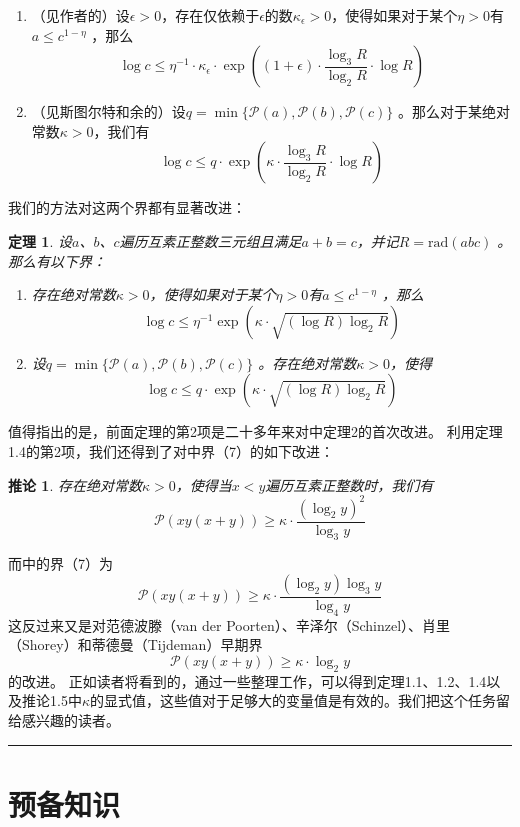\documentclass{article}
\newtheorem{theorem}{定理}
\newtheorem{corollary}{推论}
\begin{document}
\begin{enumerate}
\item （见作者的\cite{6}）设\(\epsilon>0\)，存在仅依赖于\(\epsilon\)的数\(\kappa_{\epsilon}>0\)，使得如果对于某个\(\eta>0\)有\(a \leq c^{1-\eta}\) ，那么
\[
\log c \leq \eta^{-1} \cdot \kappa_{\epsilon} \cdot \exp \left((1+\epsilon) \cdot \frac{\log _{3} R}{\log _{2} R} \cdot \log R\right) 
\]
\item
（见斯图尔特和余的\cite{12}）设\(q = \min\{\mathscr{P}(a), \mathscr{P}(b), \mathscr{P}(c)\}\) 。那么对于某绝对常数\(\kappa>0\)，我们有
\[
\log c \leq q \cdot \exp \left(\kappa \cdot \frac{\log _{3} R}{\log _{2} R} \cdot \log R\right) 
\]
\end{enumerate}
我们的方法对这两个界都有显著改进：
\begin{theorem}
设\(a\)、\(b\)、\(c\)遍历互素正整数三元组且满足\(a + b = c\)，并记\(R = \text{rad}(abc)\) 。那么有以下界：
\begin{enumerate}
\item
存在绝对常数\(\kappa>0\)，使得如果对于某个\(\eta>0\)有\(a \leq c^{1-\eta}\) ，那么
\[
\log c \leq \eta^{-1} \exp \left(\kappa \cdot \sqrt{(\log R) \log _{2} R}\right) 
\]
\item
设\(q = \min\{\mathscr{P}(a), \mathscr{P}(b), \mathscr{P}(c)\}\) 。存在绝对常数\(\kappa>0\)，使得
\[
\log c \leq q \cdot \exp \left(\kappa \cdot \sqrt{(\log R) \log _{2} R}\right) 
\]
\end{enumerate}
\end{theorem}
值得指出的是，前面定理的第2项是二十多年来对\cite{12}中定理2的首次改进。
利用定理1.4的第2项，我们还得到了对\cite{12}中界（7）的如下改进：
\setcounter{theorem}{5}
\renewcommand{\thecorollary}{1.\arabic{theorem}}
\begin{corollary}
存在绝对常数\(\kappa>0\)，使得当\(x<y\)遍历互素正整数时，我们有
\[
\mathscr{P}(xy(x + y)) \geq \kappa \cdot \frac{\left(\log _{2} y\right)^{2}}{\log _{3} y} 
\]
\end{corollary}
而\cite{12}中的界（7）为
\[
\mathscr{P}(xy(x + y)) \geq \kappa \cdot \frac{\left(\log _{2} y\right) \log _{3} y}{\log _{4} y}
\]
这反过来又是对范德波滕（van der Poorten）、辛泽尔（Schinzel）、肖里（Shorey）和蒂德曼（Tijdeman）\cite{14}早期界
\[
\mathscr{P}(xy(x + y)) \geq \kappa \cdot \log _{2} y
\]
的改进。
正如读者将看到的，通过一些整理工作，可以得到定理1.1、1.2、1.4以及推论1.5中\(\kappa\)的显式值，这些值对于足够大的变量值是有效的。我们把这个任务留给感兴趣的读者。

\newpage
\hrule
\part{预备知识}
\end{document}
